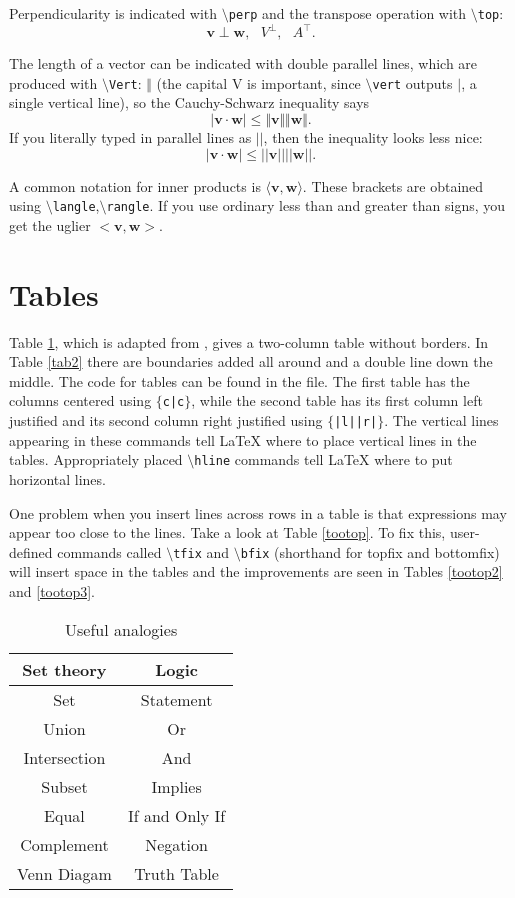 \documentclass[12pt,letterpaper]{amsart}
\newcommand{\sm}{\setminus}
\newcommand{\pln}[1]{$\sm${\tt #1}}
\theoremstyle{plain}
\theoremstyle{definition}
\numberwithin{equation}{section}
\begin{document}
Perpendicularity is indicated with \pln{perp} and the transpose operation with \pln{top}:
$$
{\mathbf v} \perp {\mathbf w}, \ \ \ V^\perp, \ \ \ A^\top.
$$

The length of a vector can be indicated with double parallel lines, which 
are produced with
\pln{Vert}: 
$\Vert$ (the capital V is important, since 
\pln{vert} 
outputs $\vert$, a single 
vertical line), 
so the Cauchy-Schwarz inequality says 
$$
|{\mathbf v}\cdot{\mathbf w}| \leq \Vert{\mathbf v}\Vert\Vert{\mathbf w}\Vert.
$$
If you literally typed in parallel lines as $||$, then the 
inequality looks less nice:
$$
|{\mathbf v}\cdot{\mathbf w}| \leq ||{\mathbf v}||||{\mathbf w}||.
$$


A common notation for inner products is 
$\langle {\mathbf v},{\mathbf w}\rangle$.  These 
brackets are obtained using \pln{langle},\pln{rangle}. 
If you use ordinary less than and greater than signs, you 
get the uglier $<{\mathbf v},{\mathbf w}>$.


\section{Tables}

Table \ref{tab1}, which is adapted from \cite[p.~11]{joyner}, gives a two-column table without borders. 
In Table \ref{tab2} there are boundaries added all around 
and a double line down the middle. 
The code for tables can be found in the file.  
The first table has the columns centered using 
{\tt $\{$c|c$\}$}, while the second table 
has its first column left justified and 
its second column right justified using 
{\tt $\{$|l||r|$\}$}.  The vertical lines 
appearing in these commands tell LaTeX 
where to place vertical lines in the tables. 
Appropriately placed \pln{hline} commands 
tell LaTeX where to put horizontal lines. 

One problem when you insert lines across rows in a table is that 
expressions may appear too close to the lines.  Take a look at 
Table \ref{tootop}.  To fix this, user-defined commands called 
\pln{tfix} and \pln{bfix} (shorthand for topfix and bottomfix) will insert 
space in the tables and the improvements are seen in 
Tables \ref{tootop2} and \ref{tootop3}. 



\begin{table}[ht]
\begin{center}
\begin{tabular}{c|c} 
Set theory & Logic \\ \hline
Set & Statement \\
Union & Or \\
Intersection & And \\
Subset & Implies \\
Equal & If and Only If \\
Complement & Negation \\
Venn Diagam & Truth Table \\
\end{tabular}
\caption{Useful analogies}\label{tab1}
\end{center}
\end{table}
\end{document}
